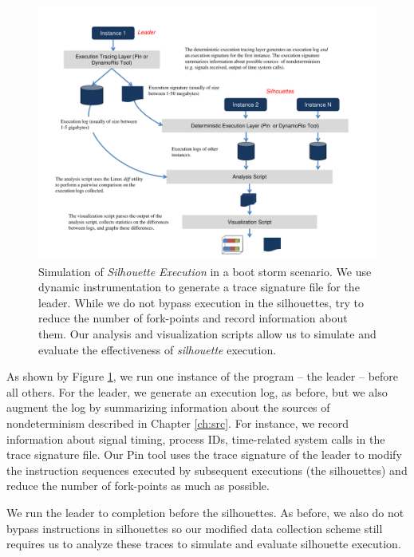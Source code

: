 \begin{figure}[]
  \center
  \includegraphics[scale=0.75, trim=2cm 0cm 1cm 0cm]
                  {simulation.pdf}
  \caption[Simulation of {\em Silhouette Execution} in a boot storm scenario]%
  {Simulation of {\em Silhouette Execution} in a boot storm scenario.
    We use dynamic instrumentation to 
    generate a trace signature file for the leader.
    While we do not bypass execution in the 
    silhouettes, try to reduce the number of fork-points 
    and record information about them.
    Our analysis and visualization
    scripts allow us to simulate and evaluate
    the effectiveness of {\em silhouette} execution.
  }
  \label{ch3:figsimulation}
\end{figure}


As shown by Figure \ref{ch3:figsimulation}, we run one instance of the
program -- the leader -- before all others.
For the leader, we generate an execution log, as before,
but we also augment the log by summarizing information about the sources of nondeterminism
described in Chapter \ref{ch:src}. For instance, we record
information about signal timing, process IDs, time-related system calls
in the trace signature file. Our Pin tool
uses the trace signature of the leader
to modify the instruction sequences executed by subsequent
executions (the silhouettes) and reduce the number of fork-points
as much as possible.

We run the leader to completion before the silhouettes.
As before, we also do not bypass instructions in silhouettes
so our modified data collection scheme still requires us
to analyze these traces to simulate and evaluate
silhouette execution.

